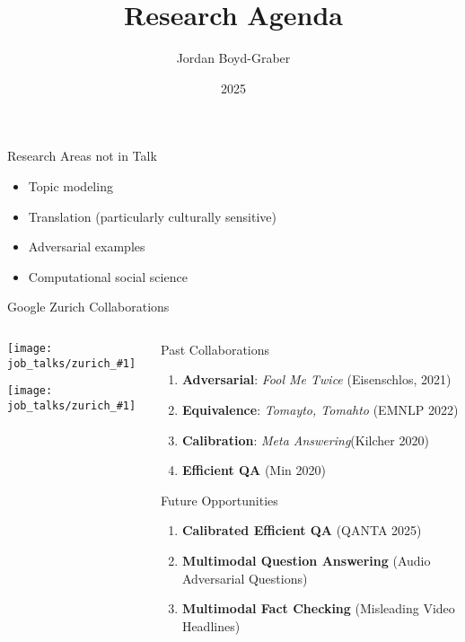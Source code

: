 \documentclass[compress]{beamer}
\title[]{Research Agenda}
\author{ Jordan Boyd-Graber}
\date{2025}
\institute[] %
{University of Maryland}
\newcommand{\gfxz}[2]{
	\begin{center}
		\texttt{[image: job\_talks/zurich\_\#1]}
	\end{center}
}
\begin{document}
\frame{
\titlepage
\tiny
}


\begin{frame}{Research Areas not in Talk}
	\begin{itemize}
		\item Topic modeling
		\item Translation (particularly culturally sensitive)
		\item Adversarial examples
		\item Computational social science
	\end{itemize}
\end{frame}


\begin{frame}{Google Zurich Collaborations}
\begin{columns}
  \begin{column}{0.25\textwidth}
    \gfxz{massi}{1.0}
    \gfxz{jannis}{1.0}
  \end{column}
  \begin{column}{0.8\textwidth}
    \begin{block}{Past Collaborations}
      \begin{enumerate}
        \item \textbf{Adversarial}:  
        \textit{Fool Me Twice} (Eisenschlos, 2021)

        \item \textbf{Equivalence}:  
        \textit{Tomayto, Tomahto} (EMNLP 2022)

        \item \textbf{Calibration}:  
          \textit{Meta Answering}(Kilcher 2020)


          \item \textbf{Efficient QA} (Min 2020)
      \end{enumerate}
    \end{block}

    \begin{block}{Future Opportunities}
      \begin{enumerate}
        \item \textbf{Calibrated Efficient QA}  (QANTA 2025)
        \item \textbf{Multimodal Question Answering} (Audio Adversarial Questions)
        \item \textbf{Multimodal Fact Checking} (Misleading Video Headlines)
      \end{enumerate}
    \end{block}
  \end{column}
\end{columns}
\end{frame}
\end{document}
